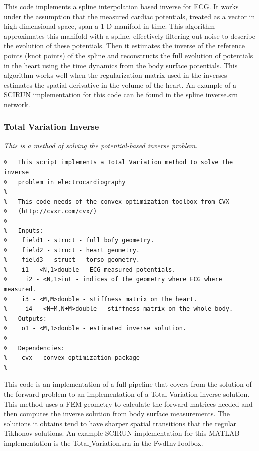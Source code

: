 This code implements a spline interpolation based inverse for ECG.
It works under the assumption that the measured cardiac potentials, treated as a vector in high dimensional space, span a 1-D manifold in time.
This algorithm approximates this manifold with a spline, effectively filtering out noise to describe the evolution of these potentials.
Then it estimates the inverse of the reference points (knot points) of the spline and reconstructs the full evolution of potentials in the heart using the time dynamics from the body surface potentials.
This algorithm works well when the regularization matrix used in the inverses estimates the spatial derivative in the volume of the heart.
An example of a SCIRUN implementation for this code can be found in the spline$\_$inverse.srn network. 

\subsubsection{Total Variation Inverse}

\vspace{5pt}\textit{This is a method of solving the potential-based inverse problem.}\vspace{5pt}
\begin{verbatim}
%	This script implements a Total Variation method to solve the inverse
%	problem in electrocardiography 
%
%	This code needs of the convex optimization toolbox from CVX
%	(http://cvxr.com/cvx/)
%
%	Inputs:
%    field1 - struct - full bofy geometry.
%    field2 - struct - heart geometry.
%    field3 - struct - torso geometry.
%    i1 - <N,1>double - ECG measured potentials.
%     i2 - <N,1>int - indices of the geometry where ECG where measured.
%    i3 - <M,M>double - stiffness matrix on the heart.
%     i4 - <N+M,N+M>double - stiffness matrix on the whole body.
%	Outputs:
%    o1 - <M,1>double - estimated inverse solution.
%
%	Dependencies:
%    cvx - convex optimization package
%
\end{verbatim}

This code is an implementation of a full pipeline that covers from the solution of the forward problem to an implementation of a Total Variation inverse solution.
This method uses a FEM geometry to calculate the forward matrices needed and then computes the inverse solution from body surface measurements.
The solutions it obtains tend to have sharper spatial transitions that the regular Tikhonov solutions.
An example SCIRUN implementation for this MATLAB implementation is the Total$\_$Variation.srn in the FwdInvToolbox.

